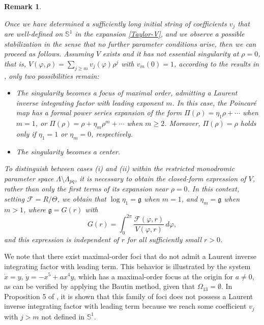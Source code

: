 \documentclass[12pt]{amsart}
\newtheorem {remark} [theorem]{\sc Remark}
\begin{document}
\begin{remark}\label{remark-principal}
{\rm Once we have determined a sufficiently long initial string of coefficients $v_j$ that are well-defined on $\mathbb{S}^1$ in the expansion \eqref{Taylor-V}, and we observe a possible stabilization in the sense that no further parameter conditions arise, then we can proceed as follows. Assuming $V$ exists and it has not essential singularity at $\rho=0$, that is, $V(\varphi, \rho) = \sum_{j \geq m} v_j(\varphi) \rho^{j}$ with $v_m(0)=1$, according to the results in \cite{GaGi4}, only two possibilities remain:

\begin{itemize}
  \item[(i)] The singularity becomes a focus of maximal order, admitting a Laurent inverse integrating factor with leading exponent $m$. In this case, the Poincar\'e map has a formal power series expansion of the form $\Pi(\rho) = \eta_1 \rho + \cdots$ when $m = 1$, or $\Pi(\rho) = \rho + \eta_m \rho^m + \cdots$ when $m \geq 2$. Moreover, $\Pi(\rho) = \rho$ holds only if $\eta_1 = 1$ or $\eta_m = 0$, respectively.

  \item[(ii)] The singularity becomes a center.
\end{itemize}

To distinguish between cases (i) and (ii) within the restricted monodromic parameter space $\Lambda \setminus \Lambda_{pq}$, it is necessary to obtain the closed-form expression of $V$, rather than only the first terms of its expansion near $\rho = 0$. In this context, setting $\mathcal{F} = R / \Theta$, we obtain that $\log \eta_1 = \mathfrak{g}$ when $m = 1$, and $\eta_m = \mathfrak{g}$ when $m > 1$, where $\mathfrak{g} = G(r)$ with
\begin{equation}\label{Function-G}
G(r) = \int_0^{2 \pi} \frac{\mathcal{F}(\varphi, r)}{V(\varphi, r)} \, d \varphi,
\end{equation}
and this expression is independent of $r$ for all sufficiently small $r > 0$.}
\end{remark}

We note that there exist maximal-order foci that do not admit a Laurent inverse integrating factor with leading term. This behavior is illustrated by the system $\dot{x}= y$, $\dot{y}= -x^5 + a x^4 y$, which has a maximal-order focus at the origin for $a \neq 0$, as can be verified by applying the Bautin method, given that $\Omega_{13} = \emptyset$. In Proposition 5 of \cite{GGR}, it is shown that this family of foci does not possess a Laurent inverse integrating factor with leading term because we reach some coefficient $v_j$ with $j > m$ not defined in $\mathbb{S}^1$.
\end{document}
